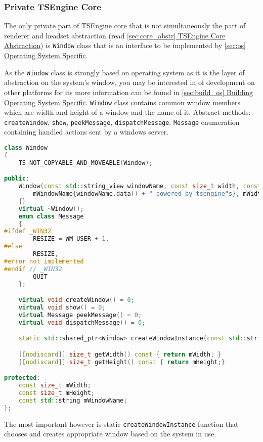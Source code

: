 \newpage
\subsubsection{Private TSEngine Core}
\label{sec:window}
\hspace{\parindent} The only private part of TSEngine core that is not simultaneously the part of renderer and headset abstraction (read \hyperref[sec:core_abstr]{\ref*{sec:core_abstr} TSEngine Core Abstraction}) is \texttt{Window} class that is an interface to be implemented by \hyperref[sec:os]{\ref*{sec:os} Operating System Specific}.

As the \texttt{Window} class is strongly based on operating system as it is the layer of abstraction on the system's window, you may be interested in of development on other platforms for its more information can be found in \hyperref[sec:build_os]{\ref*{sec:build_os} Building Operating System Specific}.
\texttt{Window} class contains common window members which are width and height of a window and the name of it. Abstract methods: \texttt{createWindow}, \texttt{show}, \texttt{peekMessage}, \texttt{dispatchMessage}. \texttt{Message} enumeration containing handled actions sent by a windows server. 
\begin{lstlisting}[language=c++, caption=Engine window interface (./engine/src/core/window.h)]
class Window
{
    TS_NOT_COPYABLE_AND_MOVEABLE(Window);

public:
    Window(const std::string_view windowName, const size_t width, const size_t height) :
        mWindowName{windowName.data() + " powered by tsengine"s}, mWidth{width}, mHeight{height}
    {}
    virtual ~Window();
    enum class Message
    {
#ifdef _WIN32
        RESIZE = WM_USER + 1,
#else
        RESIZE,
#error not implemented
#endif // _WIN32
        QUIT
    };

    virtual void createWindow() = 0;
    virtual void show() = 0;
    virtual Message peekMessage() = 0;
    virtual void dispatchMessage() = 0;

    static std::shared_ptr<Window> createWindowInstance(const std::string_view windowName, const size_t width, const size_t height);

    [[nodiscard]] size_t getWidth() const { return mWidth; }
    [[nodiscard]] size_t getHeight() const { return mHeight;}

protected:
    const size_t mWidth;
    const size_t mHeight;
    const std::string mWindowName;
};
\end{lstlisting}
The most important however is static \texttt{createWindowInstance} function that chooses and creates appropriate window based on the system in use.
